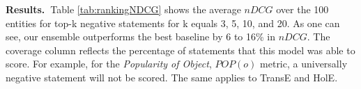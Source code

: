 \begin{table*}
  \caption{Ranking metrics evaluation results for peer-based inference.}
  \label{tab:rankingNDCG}
  \centering
  \end{table*}
  \noindent
  \textbf{Results.\ }Table \ref{tab:rankingNDCG} shows the average $nDCG$ over the 100 entities for top-k negative statements for k equals 3, 5, 10, and 20. As one can see, our ensemble outperforms the best baseline by 6 to 16\% in $nDCG$. The coverage column reflects the percentage of statements that this model was able to score. For example, for the \textit{Popularity of Object}, $POP(o)$ metric, a universally negative statement will not be scored. The same applies to TransE and HolE.
  
